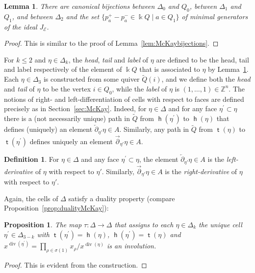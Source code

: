 \documentclass[11pt,a4paper]{amsart}
\numberwithin{equation}{section}
\newtheorem{proposition}[theorem]{Proposition}
\newtheorem{lemma}[theorem]{Lemma}
\theoremstyle{definition}
\newtheorem{definition}[theorem]{Definition}
\theoremstyle{remark}
\newcommand{\kk}{\ensuremath{\Bbbk}}
\newcommand{\ZZ}{\ensuremath{\mathbb{Z}}}
\renewcommand{\div}{\operatorname{div}}
\newcommand{\head}{\operatorname{\mathsf{h}}}
\newcommand{\tail}{\operatorname{\mathsf{t}}}
\begin{document}

 \begin{lemma}
 \label{lem:dimerbijection}
There are canonical bijections between $\Delta_0$ and $Q_0$, between $\Delta_1$ and $Q_1$, and between $\Delta_2$ and the set $\{p_a^+ - p_a^- \in \kk Q\mid a\in Q_1\}$ of minimal generators of the ideal $J_\mathscr{E}$. 
\end{lemma}
\begin{proof}
This is similar to the proof of Lemma~\ref{lem:McKaybijections}.
\end{proof}

For $k\leq 2$ and $\eta\in \Delta_k$, the \emph{head}, \emph{tail} and \emph{label} of $\eta$ are defined to be the head, tail and label respectively of the element of $\kk Q$ that is associated to $\eta$ by Lemma~\ref{lem:dimerbijection}. Each $\eta\in \Delta_3$ is constructed from some quiver $\widetilde{Q}(i)$, and we define both the \emph{head} and \emph{tail} of $\eta$ to be the vertex $i\in Q_0$, while the \emph{label} of $\eta$ is $(1,\dots,1)\in \ZZ^n$. The notions of right- and left-differentiation of cells with respect to faces are defined precisely as in Section~\ref{sec:McKay}. Indeed, for $\eta\in \Delta$ and for any face $\eta^\prime\subset \eta$ there is a (not necessarily unique) path in $\widetilde{Q}$ from $\head(\eta^\prime)$ to $\head(\eta)$ that defines (uniquely) an element $\overleftarrow{\partial}_{\!\eta'}\eta\in A$. Similarly, any path in $\widetilde{Q}$ from $\tail(\eta)$ to $\tail(\eta^\prime)$ defines uniquely an element $\overrightarrow{\partial}_{\!\eta'}\eta\in A$.

\begin{definition}
\label{def:leftrightderivativesdimer}
For $\eta\in \Delta$ and any face $\eta^\prime\subset \eta$, the element $\overleftarrow{\partial}_{\!\eta'}\eta\in A$ is the \emph{left-derivative} of $\eta$ with respect to $\eta'$. Similarly, $\overrightarrow{\partial}_{\!\eta'}\eta\in A$ is the \emph{right-derivative} of $\eta$ with respect to $\eta'$.
\end{definition}

Again, the cells of $\Delta$ satisfy a duality property (compare Proposition~\ref{prop:dualityMcKay}):

\begin{proposition}
The map $\tau\colon \Delta\to \Delta$ that assigns to each $\eta\in \Delta_k$ the unique cell $\eta^\prime\in \Delta_{3-k}$ with $\tail(\eta^\prime)=\head(\eta)$, $\head(\eta^\prime)=\tail(\eta)$ and $x^{\div(\eta^\prime)} = \prod_{\rho\in \sigma(1)}x_\rho/x^{\div(\eta)}$ is an involution.
\end{proposition}
\begin{proof}
This is evident from the construction.
\end{proof}
\end{document}
